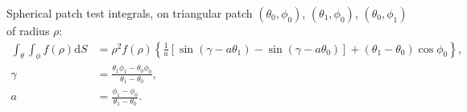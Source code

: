 \documentclass[a4paper,12pt]{article}
\newcommand{\ppoly}[3]{P_{#1,#2}^{#3}}
\newcommand{\D}{\mathrm{d}}
\begin{document}



Spherical patch test integrals, on triangular patch
$(\theta_{0},\phi_{0})$, $(\theta_{1},\phi_{0})$,
$(\theta_{0},\phi_{1})$ of radius $\rho$:
\begin{align}
  \label{equ:sphere:1}
  \int_{\theta}\int_{\phi}
  f(\rho)\D S
  &=
  \rho^{2}f(\rho)
  \left\{
    \frac{1}{a}
    \left[
      \sin(\gamma - a\theta_{1})
      -
      \sin(\gamma - a\theta_{0})
    \right]
    +
    (\theta_{1}-\theta_{0})\cos\phi_{0}
  \right\},\\
  \gamma &=
  \frac{\theta_{1}\phi_{1}-\theta_{0}\phi_{0}}{\theta_{1}-\theta_{0}},\\
  a &= \frac{\phi_{1}-\phi_{0}}{\theta_{1}-\theta_{0}}.
\end{align}
\end{document}
